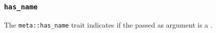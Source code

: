 
\subsubsection{\texttt{has\_name}}

The \texttt{meta::has\_name}
trait indicates if the  passed as argument is a .


